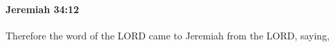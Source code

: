 
		\paragraph{Jeremiah 34:12} %
			\label{JEREMIAH-34-12}

			Therefore the word of the LORD came to Jeremiah from the LORD, saying,


